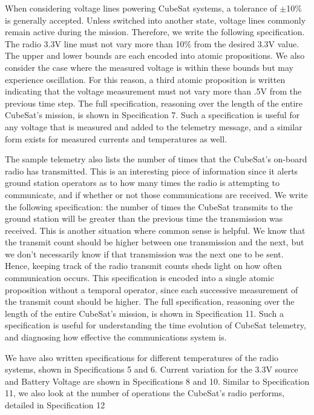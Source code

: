 \documentclass[conf]{new-aiaa}
\begin{document}
When considering voltage lines powering CubeSat systems, a tolerance of $\pm$10$\%$ is generally accepted. Unless switched into another state, voltage lines commonly remain active during the mission. Therefore, we write the following specification. The radio 3.3V line must not vary more than 10$\%$ from the desired 3.3V value. The upper and lower bounds are each encoded into atomic propositions. We also consider the case where the measured voltage is within these bounds but may experience oscillation. For this reason, a third atomic proposition is written indicating that the voltage measurement must not vary more than .5V from the previous time step. The full specification, reasoning over the length of the entire CubeSat's mission, is shown in Specification 7. Such a specification is useful for any voltage that is measured and added to the telemetry message, and a similar form exists for measured currents and temperatures as well.

The sample telemetry also lists the number of times that the CubeSat's on-board radio has transmitted. This is an interesting piece of information since it alerts ground station operators as to how many times the radio is attempting to communicate, and if whether or not those communications are received. We write the following specification: the number of times the CubeSat transmits to the ground station will be greater than the previous time the transmission was received. This is another situation where common sense is helpful. We know that the transmit count should be higher between one transmission and the next, but we don't necessarily know if that transmission was the next one to be sent. Hence, keeping track of the radio transmit counts sheds light on how often communication occurs. This specification is encoded into a single atomic proposition without a temporal operator, since each successive measurement of the transmit count should be higher. The full specification, reasoning over the length of the entire CubeSat's mission, is shown in Specification 11. Such a specification is useful for understanding the time evolution of CubeSat telemetry, and diagnosing how effective the communications system is.

We have also written specifications for different temperatures of the radio systems, shown in Specifications 5 and 6. Current variation for the 3.3V source and Battery Voltage are shown in Specifications 8 and 10. Similar to Specification 11, we also look at the number of operations the CubeSat's radio performs, detailed in Specification 12
\end{document}
